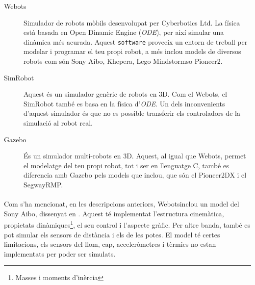 \documentclass[12pt,a4paper,final,twoside]{article}
\begin{document}
\begin{description}
\item[Webots\texttrademark] \cite{Michel2004} Simulador de robots mòbils desenvolupat per Cyberbotics Ltd. La física està basada en Open Dinamic Engine (\textit{ODE}), per així simular una dinàmica més acurada. Aquest \texttt{software} proveeix un entorn de treball per modelar i programar el teu propi robot, a més inclou models de diversos robots com són Sony Aibo, Khepera, Lego Mindstorms\texttrademark o Pioneer2.

\item[SimRobot] \cite{Laue2006a} Aquest és un simulador genèric de robots en 3D. Com el Webots\texttrademark , el SimRobot també es basa en la física d'\textit{ODE}. Un dels inconvenients d'aquest simulador és que no es possible transferir els controladors de la simulació al robot real.

\item[Gazebo] \cite{Khatib2002} És un simulador multi-robots en 3D. Aquest, al igual que Webots\texttrademark , permet el modelatge del teu propi robot, tot i ser en llenguatge C, també es diferencia amb Gazebo pels models que inclou, que són el Pioneer2DX i el SegwayRMP.
\end{description}

\paragraph{}Com s'ha mencionat, en les descripcions anteriors, Webots\texttrademark inclou un model del Sony Aibo, dissenyat en \cite{Hohl2006}. Aquest té implementat l'estructura cinemàtica, propietats dinàmiques\footnote{Masses i moments d'inèrcia}, el seu control i l'aspecte gràfic. Per altre banda, també es pot simular els sensors de distància i els de les potes. El model té certes limitacions, els sensors del llom, cap, acceleròmetres i tèrmics no estan implementats per poder ser simulats. 



\end{document}
